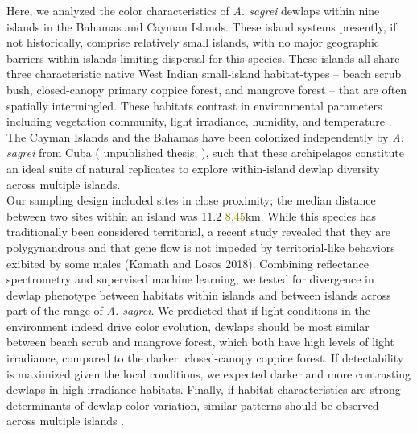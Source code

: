 Here, we analyzed the color characteristics of \textit{A. sagrei} dewlaps within nine islands in the Bahamas and Cayman Islands. These island systems presently, if not historically, comprise relatively small islands, with no major geographic barriers within islands limiting dispersal for this species. These islands all share three characteristic native West Indian small-island habitat-types -- beach scrub bush, closed-canopy primary coppice forest, and mangrove forest -- that are often spatially intermingled. These habitats contrast in environmental parameters including vegetation community, light irradiance, humidity, and temperature \citep{Howard1950, Schoener1968}. The Cayman Islands and the Bahamas have been colonized independently by \textit{A. sagrei} from Cuba (\citealt{vandeSchoot2016} unpublished thesis; \citealt{Reynolds2020}), such that these archipelagos constitute an ideal suite of natural replicates to explore within-island dewlap diversity across multiple islands.\\

Our sampling design included sites in close proximity; the median distance between two sites within an island was \sout{$11.2$} \textcolor{olive}{8.45}km. While this species has traditionally been considered territorial, a recent study revealed that they are polygynandrous and that gene flow is not impeded by territorial-like behaviors exibited by some males (Kamath and Losos 2018). Combining reflectance spectrometry and supervised machine learning, we tested for divergence in dewlap phenotype between habitats within islands and between islands across part of the range of \textit{A. sagrei}. We predicted that if light conditions in the environment indeed drive color evolution, dewlaps should be most similar between beach scrub and mangrove forest, which both have high levels of light irradiance, compared to the darker, closed-canopy coppice forest. If detectability is maximized given the local conditions, we expected darker and more contrasting dewlaps in high irradiance habitats. Finally, if habitat characteristics are strong determinants of dewlap color variation, similar patterns should be observed across multiple islands \citep{Harvey1991, Losos2011}.